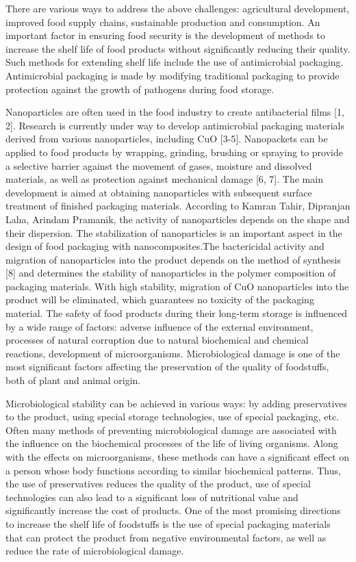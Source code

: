 There are various ways to address the above challenges: agricultural
development, improved food supply chains, sustainable production and
consumption. An important factor in ensuring food security is the
development of methods to increase the shelf life of food products
without significantly reducing their quality. Such methods for extending
shelf life include the use of antimicrobial packaging. Antimicrobial
packaging is made by modifying traditional packaging to provide
protection against the growth of pathogens during food storage.

Nanoparticles are often used in the food industry to create
antibacterial films {[}1, 2{]}. Research is currently under way to
develop antimicrobial packaging materials derived from various
nanoparticles, including CuO {[}3-5{]}. Nanopackets can be applied to
food products by wrapping, grinding, brushing or spraying to provide a
selective barrier against the movement of gases, moisture and dissolved
materials, as well as protection against mechanical damage {[}6, 7{]}.
The main development is aimed at obtaining nanoparticles with subsequent
surface treatment of finished packaging materials. According to Kamran
Tahir, Dipranjan Laha, Arindam Pramanik, the activity of nanoparticles
depends on the shape and their dispersion. The stabilization of
nanoparticles is an important aspect in the design of food packaging
with nanocomposites.The bactericidal activity and migration of
nanoparticles into the product depends on the method of synthesis
{[}8{]} and determines the stability of nanoparticles in the polymer
composition of packaging materials. With high stability, migration of
CuO nanoparticles into the product will be eliminated, which guarantees
no toxicity of the packaging material. The safety of food products
during their long-term storage is influenced by a wide range of factors:
adverse influence of the external environment, processes of natural
corruption due to natural biochemical and chemical reactions,
development of microorganisms. Microbiological damage is one of the most
significant factors affecting the preservation of the quality of
foodstuffs, both of plant and animal origin.

Microbiological stability can be achieved in various ways: by adding
preservatives to the product, using special storage technologies, use of
special packaging, etc. Often many methods of preventing microbiological
damage are associated with the influence on the biochemical processes of
the life of living organisms. Along with the effects on microorganisms,
these methods can have a significant effect on a person whose body
functions according to similar biochemical patterns. Thus, the use of
preservatives reduces the quality of the product, use of special
technologies can also lead to a significant loss of nutritional value
and significantly increase the cost of products. One of the most
promising directions to increase the shelf life of foodstuffs is the use
of special packaging materials that can protect the product from
negative environmental factors, as well as reduce the rate of
microbiological damage.

